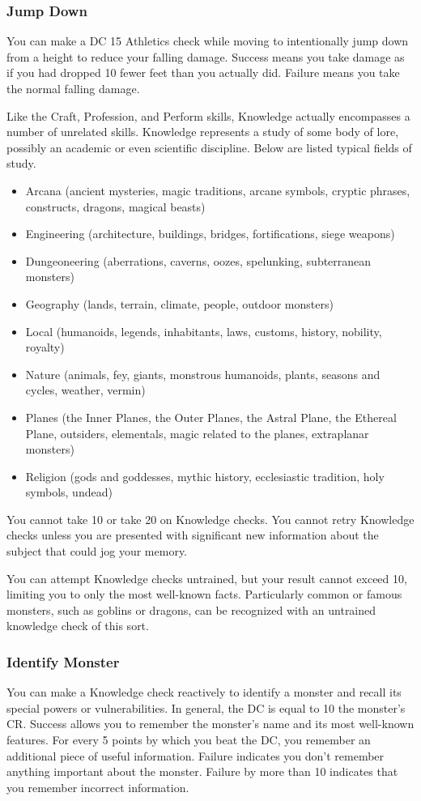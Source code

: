 \subsubsection{Jump Down}
You can make a DC 15 Athletics check while moving to intentionally jump down from a height to reduce your falling damage. Success means you take damage as if you had dropped 10 fewer feet than you actually did. Failure means you take the normal falling damage.

Like the Craft, Profession, and Perform skills, Knowledge actually encompasses a number of unrelated skills. Knowledge represents a study of some body of lore, possibly an academic or even scientific discipline. Below are listed typical fields of study.
\begin{itemize}
\item Arcana (ancient mysteries, magic traditions, arcane symbols,
cryptic phrases, constructs, dragons, magical beasts)
\item Engineering (architecture, buildings, bridges, fortifications, siege weapons)
\item Dungeoneering (aberrations, caverns, oozes, spelunking, subterranean monsters)
\item Geography (lands, terrain, climate, people, outdoor monsters)
\item Local (humanoids, legends, inhabitants, laws, customs, history, nobility, royalty)
\item Nature (animals, fey, giants, monstrous humanoids, plants, seasons and cycles, weather, vermin)
\item Planes (the Inner Planes, the Outer Planes, the Astral Plane,
the Ethereal Plane, outsiders, elementals, magic related to the planes, extraplanar monsters)
\item Religion (gods and goddesses, mythic history, ecclesiastic tradition, holy symbols, undead)
\end{itemize}

You cannot take 10 or take 20 on Knowledge checks. You cannot retry Knowledge checks unless you are presented with significant new information about the subject that could jog your memory.

You can attempt Knowledge checks untrained, but your result cannot exceed 10, limiting you to only the most well-known facts. Particularly common or famous monsters, such as goblins or dragons, can be recognized with an untrained knowledge check of this sort. 

\subsubsection{Identify Monster}
You can make a Knowledge check reactively to identify a monster and recall its special powers or vulnerabilities. In general, the DC is equal to 10 \add the monster's CR. Success allows you to remember the monster's name and its most well-known features. For every 5 points by which you beat the DC, you remember an additional piece of useful information. Failure indicates you don't remember anything important about the monster. Failure by more than 10 indicates that you remember incorrect information.

